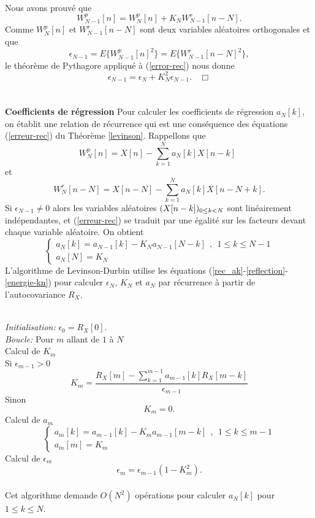 \\
Nous avons prouv\'e que
\begin{equation}
\label{error-rec}
W_{N-1}^p [n] = W_N^p [n] + 
K_N W^r_{N-1} [n-N] .
\end{equation}
Comme $W_N^p [n]$ et $W^r_{N-1} [n-N]$
sont deux variables al\'eatoires orthogonales et que
\[
\epsilon_{N-1} = E\{W_{N-1}^p [n]^2\} = 
E\{W_{N-1}^r [n-N]^2\} , 
\]
le th\'eor\`eme de Pythagore appliqu\'e \`a (\ref{error-rec}) 
nous donne
\[
\epsilon_{N-1} = \epsilon_N +  K_N^2 \epsilon_{N-1} . ~~~~\Box
\]
\\
\\
{\bf Coefficients de r\'egression}
Pour calculer les coefficients de r\'egression $a_N[k]$,
on \'etablit une relation de r\'ecurrence qui est une cons\'equence
des
\'equations (\ref{erreur-rec}) du Th\'eor\`eme 
\ref{levinson}.
Rappellons que
\[
W^p_{N}[n] = X[n] - \sum_{k=1}^N a_N[k] X[n-k] ~~
\]
et 
\[
W^r_{N}[n-N] = X[n-N] - 
\sum_{k=1}^{N} a_{N}[k] X[n-N+k] .
\]
Si $\epsilon_{N-1} \neq 0$ alors 
les variables al\'eatoires $(X[n-k])_{ 0 \leq k < N}$
sont lin\'eairement
ind\'ependantes, et (\ref{erreur-rec}) se traduit par une
\'egalit\'e sur les facteurs devant chaque variable al\'eatoire.
On obtient 
\begin{equation}
\label{rec_ak}
\left\{ \begin{array}{l}
a_N[k] =  a_{N-1} [k] - K_N a_{N-1} [N-k] ~~,~~
1 \leq k \leq N-1 \\
a_N[N] =  K_N
\end{array}
\right.
\end{equation}
L'algorithme de Levinson-Durbin utilise les \'equations 
(\ref{rec_ak}-\ref{reflection}-\ref{energie-kn})
pour calculer 
$\epsilon_N$, $K_N$ et $a_N$ par r\'ecurrence \`a partir
de l'autocovariance $R_X$.
\vspace{5mm}

\\
{\it Initialisation:}  $\epsilon_{0} = R_X[0] $.\\
{\it Boucle:} Pour $m$ allant de $1$ \`a $N$\\
Calcul de $K_m$\\
\indent Si $\epsilon_{m-1} > 0$\\
\begin{equation}
K_m = \frac {R_X [m] - \sum_{k=1}^{m-1} a_{m-1} [k] R_X[m-k]} 
{\epsilon_{m-1} } 
\end{equation}
\indent Sinon
\[
K_m = 0 .
\]
Calcul de $a_m$\\
\[
\left\{ \begin{array}{l}
a_m[k] =  a_{m-1} [k] - K_m a_{m-1} [m-k] ~~,~~
1 \leq k \leq m-1 \\
a_m[m] =  K_m
\end{array}
\right.
\]
Calcul de $\epsilon_m$\\
\[
\epsilon_m = \epsilon_{m-1} (1 - K_m^2 ) .
\]
\\
Cet algorithme
demande $O(N^2 )$ op\'erations
pour calculer $a_{N}[k]$ pour $1 \leq k \leq N$.


